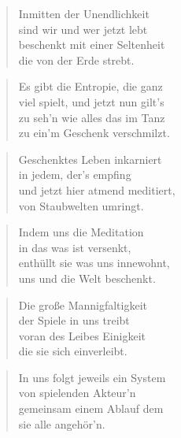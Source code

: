 \documentclass[10pt,a4paper]{article}
\begin{document}
\begin{multicols}{2}


\begin{verse}
Inmitten der Unendlichkeit \\
sind wir und wer jetzt lebt \\
beschenkt mit einer Seltenheit \\
die von der Erde strebt. \\
\end{verse}

\begin{verse}
Es gibt die Entropie, die ganz \\
viel spielt, und jetzt nun gilt’s \\
zu seh’n wie alles das im Tanz \\
zu ein’m Geschenk verschmilzt. \\
\end{verse}

\begin{verse}
Geschenktes Leben inkarniert \\
in jedem, der’s empfing \\
und jetzt hier atmend meditiert, \\
von Staubwelten umringt. \\
\end{verse}

\begin{verse}
Indem uns die Meditation \\
in das was ist versenkt, \\
enthüllt sie was uns innewohnt, \\
uns und die Welt beschenkt. \\
\end{verse}

\begin{verse}
Die große Mannigfaltigkeit \\
der Spiele in uns treibt \\
voran des Leibes Einigkeit \\
die sie sich einverleibt. \\
\end{verse}

\begin{verse}
In uns folgt jeweils ein System \\
von spielenden Akteur’n \\
gemeinsam einem Ablauf dem \\
sie alle angehör’n. \\
\end{verse}


\end{multicols}
\end{document}
